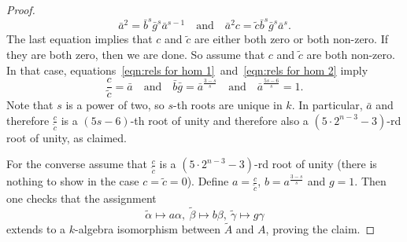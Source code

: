 \documentclass[10pt,a4paper]{amsart}
\begin{document}
\begin{proof}
\begin{equation}
    \bar a^2 = \bar b^s \bar g^s\bar a^{s-1} \quad \textrm{and} \quad \bar a^2 c= \tilde c \bar b^s \bar g^s \bar a^s.
  \end{equation}
  The last equation implies that $c$ and $\tilde c$ are either both zero or both non-zero. If they are both zero, then we are done. So assume that $c$ and $\tilde c$ are both non-zero. 
  In that case, equations~\eqref{eqn:rels for hom 1}~and~\eqref{eqn:rels for hom 2} imply 
  $$
    \frac{c}{\tilde c} = \bar a \quad\textrm{and} \quad \bar b \bar g =\bar a^{\frac{3-s}{s}} \quad \textrm{and} \quad \bar a^{\frac{5s-6}{s}}=1.
  $$
  Note that $s$ is a power of two, so $s$-th roots are unique in $k$. In particular, $\bar a$ and therefore $\frac{c}{\tilde c}$ is a $(5s-6)$-th root of unity and therefore also a $(5\cdot 2^{n-3}-3)$-rd root of unity, as claimed.

  For the converse assume that $\frac{c}{\tilde c}$ is a $(5\cdot 2^{n-3}-3)$-rd root of unity (there is nothing to show in the case $c=\tilde c=0$). Define $a=\frac{c}{\tilde c}$, $b=a^{\frac{3-s}{s}}$ and $g=1$. Then one checks that the assignment
  $$
    \tilde \alpha \mapsto a \alpha, \ \tilde \beta \mapsto b \beta, \ \tilde \gamma \mapsto g \gamma
  $$
  extends to a $k$-algebra isomorphism between $\tilde A$ and $A$, proving the claim.
\end{proof}
\end{document}
